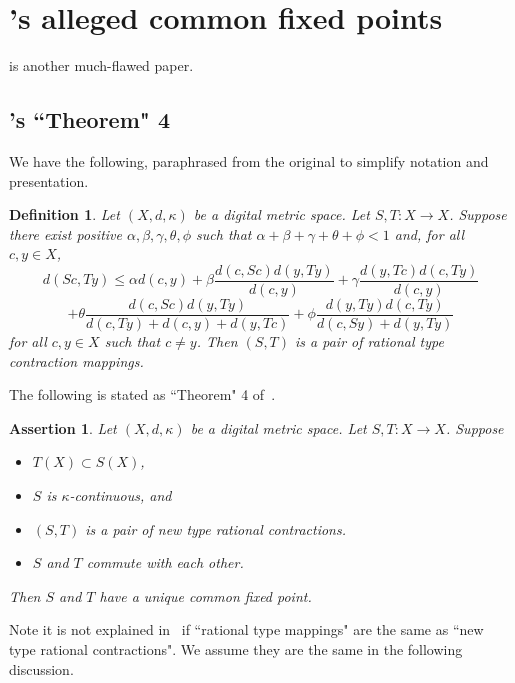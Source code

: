 \documentclass{article}
\newtheorem{assert}[thm]{Assertion}
\newtheorem{definition}[thm]{Definition}
\numberwithin{thm}{section}
\begin{document}
\section{\cite{OzEtal}'s alleged common fixed
points}
\cite{OzEtal} is another much-flawed paper.

\subsection{\cite{OzEtal}'s ``Theorem" 4}
We have the following, paraphrased from the
original to simplify notation and presentation.

\begin{definition}
    {\rm \cite{OzEtal}} 
    \label{rational}
    Let $(X,d, \kappa)$ be a digital 
    metric space. Let $S,T: X \to X$. Suppose
    there exist positive
    $\alpha, \beta, \gamma, \theta, \phi$
    such that 
    $\alpha + \beta + \gamma + \theta + \phi < 1$ and, for all $c,y \in X$,
    \[
        d(Sc,Ty) \le \alpha d(c,y) +
        \beta \frac{d(c,Sc) d(y,Ty)}{d(c,y)}
    + \gamma \frac{d(y,Tc) d(c,Ty)}{d(c,y)}
    \]
    \begin{equation}
    \label{OzEtal4.1ineq}
    + \theta \frac{d(c,Sc) d(y,Ty)}{d(c,Ty) + d(c,y) + d(y,Tc)} 
    + \phi \frac{d(y,Ty) d(c,Ty)}{d(c,Sy)+d(y,Ty)}
    \end{equation}     
    for all $c,y \in X$ such that $c \neq y$.
    Then  $(S,T)$ is a pair of {\em rational 
    type contraction mappings}.
\end{definition}

The following is stated as ``Theorem" 4
of~\cite{OzEtal}.

\begin{assert}
\label{OzEtal4}
    Let $(X,d,\kappa)$ be a digital metric
    space. Let $S,T: X \to X$. Suppose
    \begin{itemize}
        \item $T(X) \subset S(X)$,
        \item $S$ is $\kappa$-continuous, and
        \item $(S,T)$ is a pair of new type
        rational contractions.
        \item $S$ and $T$ commute with each
        other.
    \end{itemize}
    Then $S$ and $T$ have a unique common
    fixed point.
\end{assert}

Note it is not explained in~\cite{OzEtal} 
if ``rational type mappings" are the same as
``new type rational contractions". We assume
they are the same in the following discussion.
\end{document}
